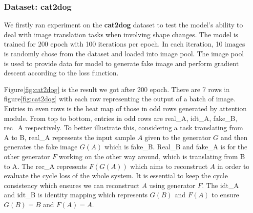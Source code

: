 \documentclass{article}
\begin{document}
\subsubsection{Dataset: \textbf{cat2dog}}
We firstly ran experiment on the \textbf{cat2dog} dataset to test the model's ability to deal with image translation tasks when involving shape changes. The model is trained for 200 epoch with 100 iterations per epoch. In each iteration, 10 images is randomly chose from the dataset and loaded into image pool. The image pool is used to provide data for model to generate fake image and perform gradient descent according to the loss function.

Figure\ref{fig:cat2dog} is the result we got after 200 epoch. There are 7 rows in figure\ref{fig:cat2dog} with each row representing the output of a batch of image. Entries in even rows is the heat map of those in odd rows generated by attention module. From top to bottom, entries in odd rows are real\_A, idt\_A, fake\_B, rec\_A respectively. To better illustrate this, considering a task translating from A to B, real\_A represents the input sample $A$ given to the generator $G$ and then generates the fake image $G(A)$ which is fake\_B. Real\_B and fake\_A is for the other generator $F$ working on the other way around, which is translating from B to A. The rec\_A represents $F(G(A))$ which aims to reconstruct $A$ in order to evaluate the cycle loss of the whole system. It is essential to keep the cycle consistency which ensures we can reconstruct $A$ using generator $F$. The idt\_A and idt\_B is identity mapping which represents $G(B)$ and $F(A)$ to ensure $G(B)=B$ and $F(A)=A$.
\end{document}
